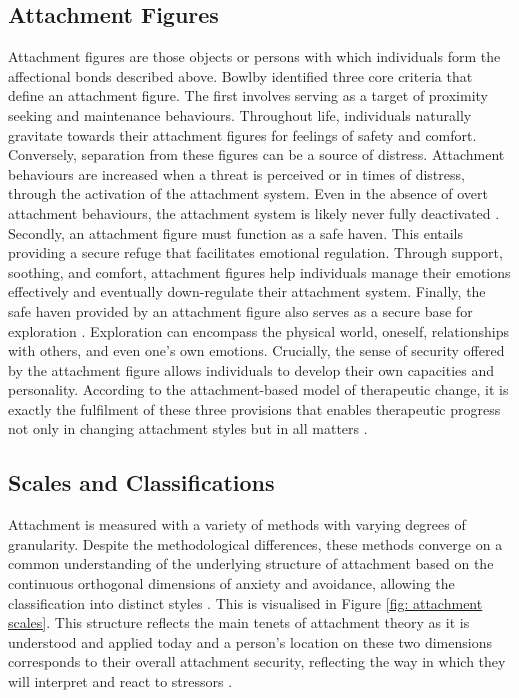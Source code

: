 \documentclass[12pt]{report}
\begin{document}
\subsection*{Attachment Figures}
Attachment figures are those objects or persons with which individuals form the affectional bonds described above.
Bowlby \citeyear{Bowlby1969attachment} identified three core criteria that define an attachment figure.
The first involves serving as a target of proximity seeking and maintenance behaviours.
Throughout life, individuals naturally gravitate towards their attachment figures for feelings of safety and comfort.
Conversely, separation from these figures can be a source of distress.
Attachment behaviours are increased when a threat is perceived or in times of distress, through the activation of the attachment system.
Even in the absence of overt attachment behaviours, the attachment system is likely never fully deactivated \cite{Bowlby1969attachment}.
Secondly, an attachment figure must function as a safe haven. This entails providing a secure refuge that facilitates emotional regulation.
Through support, soothing, and comfort, attachment figures help individuals manage their emotions effectively and eventually down-regulate their attachment system.
Finally, the safe haven provided by an attachment figure also serves as a secure base for exploration \cite{Bowlby1969attachment}.
Exploration can encompass the physical world, oneself, relationships with others, and even one's own emotions.
Crucially, the sense of security offered by the attachment figure allows individuals to develop their own capacities and personality.
According to the attachment-based model of therapeutic change, it is exactly the fulfilment of these three provisions that enables therapeutic progress not only in changing attachment styles but in all matters \cite{Bowlby1969attachment, Mikulincer2013}.

\subsection*{Scales and Classifications}
Attachment is measured with a variety of methods with varying degrees of granularity.
Despite the methodological differences, these methods converge on a common understanding of the underlying structure of attachment based on the continuous orthogonal dimensions of anxiety and avoidance, allowing the classification into distinct styles \cite{Brennan1998,Mikulincer2013}.
This is visualised in Figure \ref{fig: attachment scales}.
This structure reflects the main tenets of attachment theory as it is understood and applied today and a person's location on these two dimensions corresponds to their overall attachment security, reflecting the way in which they will interpret and react to stressors \cite{Mikulincer2007}.
\end{document}
